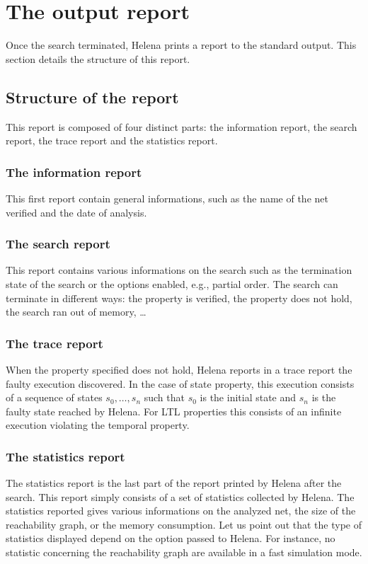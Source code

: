 \section{The output report}
\label{section_output_report}
Once the search terminated, Helena prints a report to the standard
output.  This section details the structure of this report.

\subsection{Structure of the report}
This report is composed of four distinct parts: the information report, the
search report, the trace report and the statistics report.

\subsubsection{The information report}
This first report contain general informations, such as the name of the net
verified and the date of analysis.

\subsubsection{The search report}
This report contains various informations on the search such as the
termination state of the search or the options enabled, e.g., partial
order. The search can terminate in different ways: the property is
verified, the property does not hold, the search ran out of memory,
\ldots

\subsubsection{The trace report}
When the property specified does not hold, Helena reports in a trace
report the faulty execution discovered.  In the case of state
property, this execution consists of a sequence of states $s_0, \dots,
s_n$ such that $s_0$ is the initial state and $s_n$ is the faulty
state reached by Helena.  For LTL properties this consists of an
infinite execution violating the temporal property.

\subsubsection{The statistics report}
The statistics report is the last part of the report printed by Helena
after the search.  This report simply consists of a set of statistics
collected by Helena. The statistics reported gives various
informations on the analyzed net, the size of the reachability graph,
or the memory consumption.  Let us point out that the type of
statistics displayed depend on the option passed to Helena.  For
instance, no statistic concerning the reachability graph are available
in a fast simulation mode.
